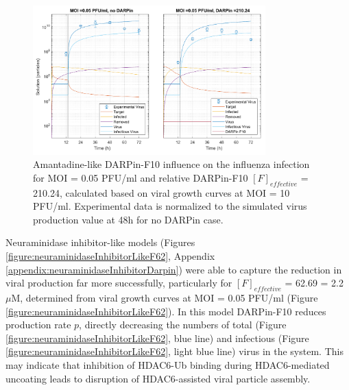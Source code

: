 \begin{figure}
\begin{center}
\includegraphics[width=0.8\textwidth, trim={0cm 0cm 0cm 0cm}, clip]{D_chapters/3_DARPinModels/2_DARPinInfection/comparisonModelTHillIRVViDelayMOI0.072135DARPin210.236AsymmetricDarpinMyosinInhibitor.pdf}
\caption[Amantadine-like DARPin-F10 for MOI = 0.05 PFU/ml and $F_{effective}$ = 210.24]{Amantadine-like DARPin-F10 influence on the influenza infection for MOI = 0.05 PFU/ml and relative DARPin-F10 $[F]_{effective}$ = 210.24, calculated based on viral growth curves at MOI = 10 PFU/ml. Experimental data is normalized to  the simulated virus production value at 48h for no DARPin case.}
\label{figure:amantadineLikeF210}
\end{center}
\end{figure}

Neuraminidase inhibitor-like models (Figures \ref{figure:neuraminidaseInhibitorLikeF62}, Appendix \ref{appendix:neuraminidaseInhibitorDarpin}) were able to capture the reduction in viral production far more successfully, particularly for $[F]_{effective}$ = 62.69 = 2.2 $\mu$M, determined from viral growth curves at MOI = 0.05 PFU/ml (Figure \ref{figure:neuraminidaseInhibitorLikeF62}). In this model DARPin-F10 reduces production rate $p$, directly decreasing the numbers of total (Figure \ref{figure:neuraminidaseInhibitorLikeF62}, blue line) and infectious (Figure \ref{figure:neuraminidaseInhibitorLikeF62}, light blue line) virus in the system. This may indicate that inhibition of HDAC6-Ub binding during HDAC6-mediated uncoating leads to disruption of HDAC6-assisted viral particle assembly.

